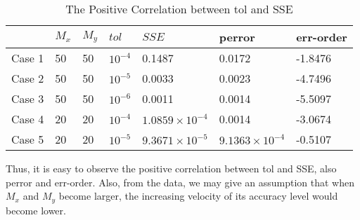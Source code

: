 \documentclass[a4paper]{article}
\begin{document}
\begin{table}[!htbp]
\centering
\caption{The Positive Correlation between tol and SSE}
\begin{tabular}{|l|l|l|l|l|l|l|}
\hline
 & ${M_x}$ & ${M_y}$ & $tol$ & $SSE$ & perror & err-order\\
\hline
 Case 1 & 50 & 50 & ${10^{ - 4}}$ & 0.1487 & 0.0172 & -1.8476\\
\hline
 Case 2 & 50 & 50 & ${10^{ - 5}}$ & 0.0033 & 0.0023 & -4.7496\\
\hline
 Case 3 & 50 & 50 & ${10^{ - 6}}$ & 0.0011 & 0.0014 & -5.5097\\
\hline
 Case 4 & 20 & 20 & ${10^{ - 4}}$ & $1.0859 \times {10^{ - 4}}$ & 0.0014 & -3.0674\\
\hline
 Case 5 & 20 & 20 & ${10^{ - 5}}$ & $9.3671 \times {10^{ - 5}}$ & $9.1363 \times {10^{ - 4}}$ & -0.5107\\
\hline
\end{tabular}
\end{table}
Thus, it is easy to observe the positive correlation between tol and SSE, also perror and err-order. Also, from the data, we may give an assumption that when ${M_x}$ and ${M_y}$ become larger, the increasing velocity of its accuracy level would become lower.
\end{document}
